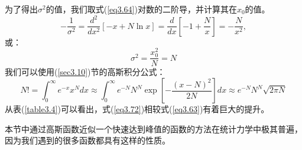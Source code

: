 \documentclass[UTF8]{ctexart}
\numberwithin{equation}{section}%
\numberwithin{figure}{section}%
\begin{document}
    为了得出$\sigma^2$的值，我们取式(\ref{eq3.64})对数的二阶导，并计算其在$x_0$的值。
    \begin{equation}
        -\frac{1}{\sigma^{2}}=\frac{d^{2}}{d x^{2}}[-x+N \ln x]=\frac{d}{d x}\left[-1+\frac{N}{x}\right]=-\frac{N}{x^{2}},
    \end{equation}
    或：
    \begin{equation}
    \sigma^{2}=\frac{x_{0}^{2}}{N}=N
    \end{equation}
    我们可以使用(\ref{sec3.10})节的高斯积分公式：
    \begin{equation}\label{eq3.72}
        N !=\int_{0}^{\infty} e^{-x} x^{N} d x \approx \int_{0}^{\infty} e^{-N} N^{N} \exp \left[-\frac{(x-N)^{2}}{2 N}\right] d x \approx e^{-N} N^{N} \sqrt{2 \pi N}
    \end{equation}
    从表(\ref{table3.4})可以看出，式(\ref{eq3.72})相较式(\ref{eq3.63})有着巨大的提升。
    \begin{mdframed}[backgroundcolor=lightgray,hidealllines=true]
        本节中通过高斯函数近似一个快速达到峰值的函数的方法在统计力学中极其普遍，因为我们遇到的很多函数都具有这样的性质。
    \end{mdframed}
    \begin{table}[H]
        \centering
        \caption{\textit{各阶斯特林近似与$N!$准确结果的对比。“斯特林（简单）”即式(\ref{eq3.63})，“斯特林（改进）”即式(\ref{eq3.72})，“高斯帕”即式(\ref{eq3.73})}。}
        \label{table3.4}
        \end{table}
        
\end{document}
